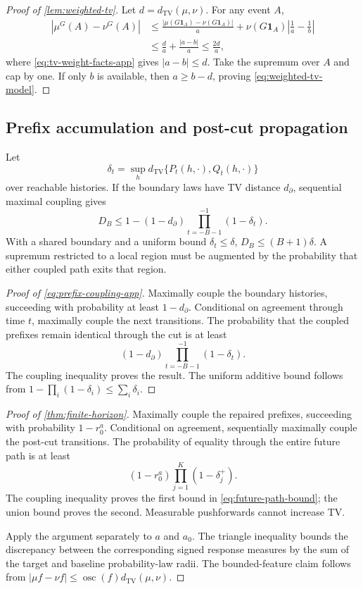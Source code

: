 \documentclass{article}
\newcommand{\TV}{d_{\mathrm{TV}}}
\newcommand{\osc}{\operatorname{osc}}
\theoremstyle{remark}
\begin{document}
\begin{proof}[Proof of \cref{lem:weighted-tv}]
Let \(d=\TV(\mu,\nu)\). For any event \(A\),
\[
\begin{split}
  |\mu^G(A)-\nu^G(A)|
  &\leq
  \frac{|\mu(G\mathbf 1_A)-\nu(G\mathbf 1_A)|}{a}
  +
  \nu(G\mathbf 1_A)\left|\frac1a-\frac1b\right|\\
  &\leq
  \frac{d}{a}+\frac{|a-b|}{a}
  \leq\frac{2d}{a},
\end{split}
\]
where \cref{eq:tv-weight-facts-app} gives \(|a-b|\leq d\). Take the
supremum over \(A\) and cap by one. If only \(b\) is available, then
\(a\geq b-d\), proving \cref{eq:weighted-tv-model}.
\end{proof}

\subsection{Prefix accumulation and post-cut propagation}

Let
\[
  \delta_t
  =
  \sup_h\TV\{P_t(h,\cdot),Q_t(h,\cdot)\}
\]
over reachable histories. If the boundary laws have TV distance
\(d_\partial\), sequential maximal coupling gives
\begin{equation}
  D_B
  \leq
  1-(1-d_\partial)
  \prod_{t=-B-1}^{-1}(1-\delta_t).
  \label{eq:prefix-coupling-app}
\end{equation}
With a shared boundary and a uniform bound \(\delta_t\leq\delta\),
\(D_B\leq(B+1)\delta\). A supremum restricted to a local region must be
augmented by the probability that either coupled path exits that region.

\begin{proof}[Proof of \cref{eq:prefix-coupling-app}]
Maximally couple the boundary histories, succeeding with probability at least
\(1-d_\partial\). Conditional on agreement through time \(t\), maximally
couple the next transitions. The probability that the coupled prefixes remain
identical through the cut is at least
\[
  (1-d_\partial)
  \prod_{t=-B-1}^{-1}(1-\delta_t).
\]
The coupling inequality proves the result. The uniform additive bound follows
from \(1-\prod_i(1-\delta_i)\leq\sum_i\delta_i\).
\end{proof}

\begin{proof}[Proof of \cref{thm:finite-horizon}]
Maximally couple the repaired prefixes, succeeding with probability
\(1-r_0^a\). Conditional on agreement, sequentially maximally couple the
post-cut transitions. The probability of equality through the entire future
path is at least
\[
  (1-r_0^a)\prod_{j=1}^{K}(1-\delta_j^+).
\]
The coupling inequality proves the first bound in
\cref{eq:future-path-bound}; the union bound proves the second. Measurable
pushforwards cannot increase TV.

Apply the argument separately to \(a\) and \(a_0\). The triangle inequality
bounds the discrepancy between the corresponding signed response measures by
the sum of the target and baseline probability-law radii. The bounded-feature
claim follows from
\(|\mu f-\nu f|\leq\osc(f)\TV(\mu,\nu)\).
\end{proof}
\end{document}
